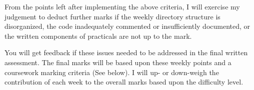 \begin{appendices}
From the points left after implementing the above criteria, I will 
exercise my judgement to deduct further marks if the weekly directory 
structure is disorganized, the code inadequately commented or 
insufficiently documented, or the written components of practicals are 
not up to the mark. 

You will get feedback if these issues needed to be addressed in the 
final written assessment. The final marks will be based upon these 
weekly points and a coursework marking criteria (See below). I will 
 up- or down-weigh the contribution of each week to the 
overall marks based upon the difficulty level. 


\end{appendices}
